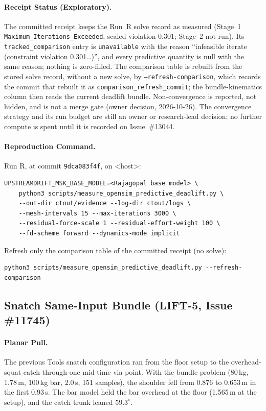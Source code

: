 \documentclass[11pt,a4paper]{article}
\begin{document}
\paragraph{Receipt Status (Exploratory).}
The committed receipt keeps the Run~R solve record as measured (Stage~1 \texttt{Maximum\_Iterations\_Exceeded}, scaled violation 0.301; Stage~2 not run). Its \texttt{tracked\_comparison} entry is \texttt{unavailable} with the reason ``infeasible iterate (constraint violation 0.301\ldots)'', and every predictive quantity is null with the same reason; nothing is zero-filled. The comparison table is rebuilt from the stored solve record, without a new solve, by \texttt{--refresh-comparison}, which records the commit that rebuilt it as \texttt{comparison\_refresh\_commit}; the bundle-kinematics column then reads the current deadlift bundle. Non-convergence is reported, not hidden, and is not a merge gate (owner decision, 2026-10-26). The convergence strategy and its run budget are still an owner or research-lead decision; no further compute is spent until it is recorded on Issue~\#13044.

\paragraph{Reproduction Command.}
Run R, at commit \texttt{9dca083f4f}, on <host>:
\begin{verbatim}
UPSTREAMDRIFT_MSK_BASE_MODEL=<Rajagopal base model> \
    python3 scripts/measure_opensim_predictive_deadlift.py \
    --out-dir ctout/evidence --log-dir ctout/logs \
    --mesh-intervals 15 --max-iterations 3000 \
    --residual-force-scale 1 --residual-effort-weight 100 \
    --fd-scheme forward --dynamics-mode implicit
\end{verbatim}
Refresh only the comparison table of the committed receipt (no solve):
\begin{verbatim}
python3 scripts/measure_opensim_predictive_deadlift.py --refresh-comparison
\end{verbatim}


\subsection{Snatch Same-Input Bundle (LIFT-5, Issue \#11745)}
\paragraph{Planar Pull.} The previous Tools snatch configuration ran from
the floor setup to the overhead-squat catch through one mid-time via point.
With the bundle problem (80\,kg, 1.78\,m, 100\,kg bar, 2.0\,s, 151 samples),
the shoulder fell from 0.876 to 0.653\,m in the first 0.93\,s. The bar model
held the bar overhead at the floor (1.565\,m at the setup), and the catch
trunk leaned $59.3^\circ$.
\end{document}
